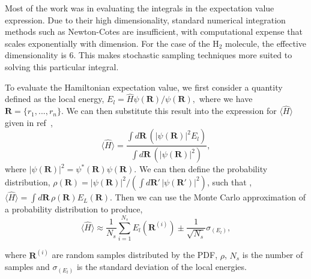 \documentclass[journal,12pt]{Imperial_lab_report}
\begin{document}
    Most of the work was in evaluating the integrals in the expectation value expression. Due to their high dimensionality, standard numerical integration methods such as Newton-Cotes are insufficient, with computational expense that scales exponentially with dimension. For the case of the H$_2$ molecule, the effective dimensionality is 6. This makes stochastic sampling techniques more suited to solving this particular integral.

    To evaluate the Hamiltonian expectation value, we first consider a quantity defined as the local energy, $E_l = {\hat{H} \psi(\boldsymbol{R})}/{\psi(\boldsymbol{R})},$ where we have $\boldsymbol{R} =\{r_1, ..., r_n\}$. We can then substitute this result into the expression for $\langle \hat{H} \rangle$ given in ref~\cite{scott_computational},
    \begin{equation} \label{H_exp}
        \langle \hat{H} \rangle =
        \frac{
        \int d\boldsymbol{R}\,(|\psi(\boldsymbol{R})|^2 E_l)
        }{
        \int d\boldsymbol{R}\,(|\psi(\boldsymbol{R})|^2)
        },
    \end{equation}
    \noindent where $|\psi(\boldsymbol{R})|^2 = \psi^{*}(\boldsymbol{R})\psi(\boldsymbol{R})$. We can then define the probability distribution, $\rho(\mathbf{R}) = {|\psi(\mathbf{R})|^2}/{(\int d\mathbf{R'} \, |\psi(\mathbf{R'})|^2)}$,  such that , $\langle \hat{H} \rangle = \int d\mathbf{R} \, \rho(\mathbf{R}) E_L(\mathbf{R})$. Then we can use the Monte Carlo approximation of a probability distribution to produce,
    \begin{equation} \label{MC hamiltonian expectation}
        \langle \hat{H} \rangle \approx \frac{1}{N_s} \sum_{i=1}^{N_s} E_l(\boldsymbol{R}^{(i)}) \pm \frac{1}{\sqrt{N_s}}\sigma_{(E_l)},
    \end{equation}

    \noindent where $\boldsymbol{R}^{(i)}$ are random samples distributed by the PDF, $\rho$, $N_s$ is the number of samples and $\sigma_{(E_l)}$ is the standard deviation of the local energies.
\end{document}
